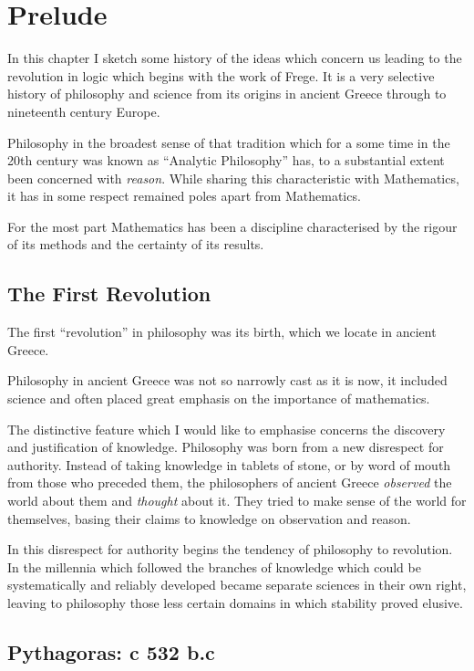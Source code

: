\chapter{Prelude}\label{Prelude}

In this chapter I sketch some history of the ideas which concern us leading to the revolution in logic which begins with the work of Frege.
It is a very selective history of philosophy and science from its origins in ancient Greece through to nineteenth century Europe.

Philosophy in the broadest sense of that tradition which for a some time in the 20th century was known as ``Analytic Philosophy'' has, to a substantial extent been concerned with {\it reason}.
While sharing this characteristic with Mathematics, it has in some respect remained poles apart from Mathematics.

For the most part Mathematics has been a discipline characterised by the rigour of its methods and the certainty of its results.

\section{The First Revolution}

The first ``revolution'' in philosophy was its birth, which we locate in ancient Greece.

Philosophy in ancient Greece was not so narrowly cast as it is now, it included science and often placed great emphasis on the importance of mathematics.

The distinctive feature which I would like to emphasise concerns the discovery and justification of knowledge.
Philosophy was born from a new disrespect for authority.
Instead of taking knowledge in tablets of stone, or by word of mouth from those who preceded them, the philosophers of ancient Greece {\it observed} the world about them and {\it thought} about it.
They tried to make sense of the world for themselves, basing their claims to knowledge on observation and reason.

In this disrespect for authority begins the tendency of philosophy to revolution.
In the millennia which followed the branches of knowledge which could be systematically and reliably developed became separate sciences in their own right, leaving to philosophy those less certain domains in which stability proved elusive.


\section{Pythagoras: c 532 b.c}

